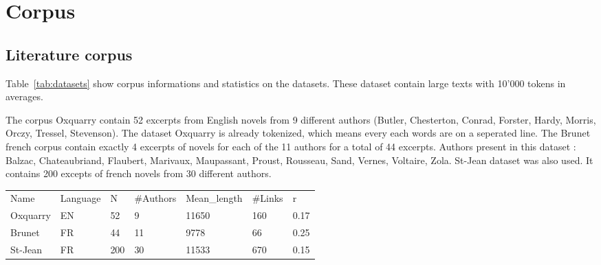 \section{Corpus}

\subsection{Literature corpus}

Table~\ref{tab:datasets} show corpus informations and statistics on the datasets.
These dataset contain large texts with 10'000 tokens in averages.

The corpus Oxquarry contain 52 excerpts from English novels from 9 different authors (Butler, Chesterton, Conrad, Forster, Hardy, Morris, Orczy, Tressel, Stevenson).
The dataset Oxquarry is already tokenized, which means every each words are on a seperated line.
The Brunet french corpus contain exactly 4 excerpts of novels for each of the 11 authors for a total of 44 excerpts.
Authors present in this dataset : Balzac, Chateaubriand, Flaubert, Marivaux, Maupassant, Proust, Rousseau, Sand, Vernes, Voltaire, Zola.
St-Jean dataset was also used.
It contains 200 excepts of french novels from 30 different authors.

\begin{table*}[t]
  \caption{General information on the datasets}
  \label{tab:datasets}
  \begin{tabular}{|l|l|l|l|l|l|l|}
    Name & Language & N & \#Authors & Mean\_length & \#Links & r \\
    Oxquarry & EN & 52 & 9 & 11650 & 160 & 0.17\\
    Brunet & FR & 44 & 11 & 9778 & 66 & 0.25\\
    St-Jean & FR & 200 & 30 & 11533 & 670 & 0.15\\
  \end{tabular}
\end{table*}



\subsection{}
